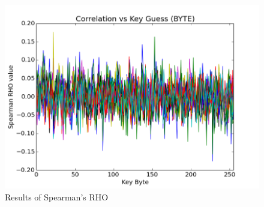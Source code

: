 \begin{figure}[H]
\begin{center}
\includegraphics[scale=0.8]{figures/spearman-rho}
\caption{\label{fig:spcorrplt}{Results of Spearman's RHO}}
\end{center} 
\vspace{-3ex}
\end{figure}


